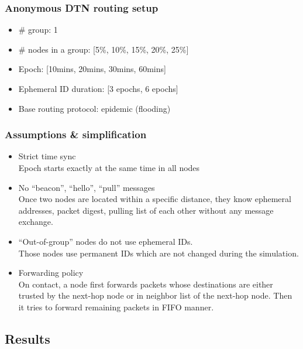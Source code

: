 \documentclass[11pt]{article}
\begin{document}
\subsubsection{Anonymous DTN routing setup}
\begin{itemize}
 \item \# group: 1
 \item \# nodes in a group: [5\%, 10\%, 15\%, 20\%, 25\%]
 \item Epoch: [10mins, 20mins, 30mins, 60mins]
 \item Ephemeral ID duration: [3 epochs, 6 epochs]
 \item Base routing protocol: epidemic (flooding)
\end{itemize}



\subsubsection{Assumptions \& simplification}
\begin{itemize}

 \item Strict time sync\\
Epoch starts exactly at the same time in all nodes

 \item No ``beacon'', ``hello'', ``pull'' messages\\
 Once two nodes are located within a specific distance, they know ephemeral addresses, packet digest, pulling list of each other without any message exchange. 

 \item ``Out-of-group'' nodes do not use ephemeral IDs.\\
 Those nodes use permanent IDs which are not changed during the simulation.

 \item Forwarding policy\\
On contact, a node first forwards packets whose destinations are either trusted by the next-hop node or in neighbor list of the next-hop node.  Then it tries to forward remaining packets in FIFO manner. 
\end{itemize}

\clearpage
\subsection{Results}
\end{document}
